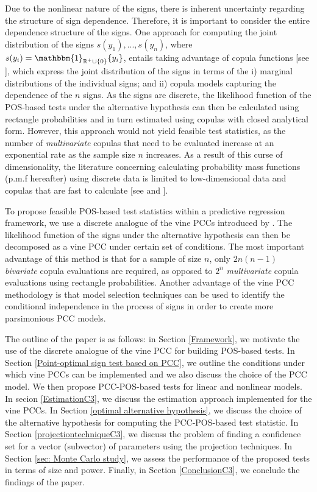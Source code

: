 \documentclass[harvard,11pt]{article}
\newcommand{\R}{\mathbb{R}}
\begin{document}
Due to the nonlinear nature of the signs, there is inherent uncertainty regarding the structure of sign dependence. Therefore, it is important to consider the entire dependence structure of the signs. One approach for computing the joint distribution of the signs $s(y_1),...,s(y_n)$, where $s(y_i)=\mathbbm{1}_{\R^+ \cup\{0\} }\{y_i\}$, entails taking advantage of copula functions [see \citet{sklar1959fonctions}], which express the joint distribution of the signs in terms of the i) marginal distributions of the individual signs; and ii) copula models capturing the dependence of the $n$ signs. As the signs are discrete, the likelihood function of the POS-based tests under the alternative hypothesis can then be calculated using rectangle probabilities and in turn estimated using copulas with closed analytical form. However, this approach would not yield feasible test statistics, as the number of \textit{multivariate} copulas that need to be evaluated increase at an exponential rate as the sample size $n$ increases. As a result of this curse of dimensionality, the literature concerning calculating probability mass functions (p.m.f hereafter) using discrete data is limited to low-dimensional data and copulas that are fast to calculate [see \citet{nikoloulopoulos2008multivariate,nikoloulopoulos2009finite} and \citet{li2010two}]. 

To propose feasible POS-based test statistics within a predictive regression framework, we use a discrete analogue of the vine PCCs introduced by \citet{panagiotelis2012pair}. The likelihood function of the signs under the alternative hypothesis can then be decomposed as a vine PCC under certain set of conditions. The most important advantage of this method is that for a sample of size $n$, only $2n(n-1)$ \textit{bivariate} copula evaluations are required, as opposed to $2^n$ \textit{multivariate} copula evaluations using rectangle probabilities. Another advantage of the vine PCC methodology is that model selection techniques can be used to identify the conditional independence in the process of signs in order to create more parsimonious PCC models. 


The outline of the paper is as follows: in Section \ref{Framework}, we motivate the use of the discrete analogue of the vine PCC for building POS-based tests. In Section \ref{Point-optimal sign
test based on PCC}, we outline the conditions under which vine PCCs can be implemented and we also discuss the choice of the PCC model. We then propose PCC-POS-based tests for linear and nonlinear models. In secion \ref{EstimationC3}, we discuss the estimation approach implemented for the vine PCCs. In Section \ref{optimal alternative hypothesis}, we discuss the choice of the alternative hypothesis for computing the PCC-POS-based test statistic. In Section \ref{projectiontechniqueC3}, we discuss the problem of finding a confidence set for a vector (subvector) of parameters using the projection techniques. In Section \ref{sec: Monte Carlo study}, we assess the performance of the proposed tests in terms of size and power. Finally, in Section \ref{ConclusionC3}, we conclude the findings of the paper.
\end{document}
